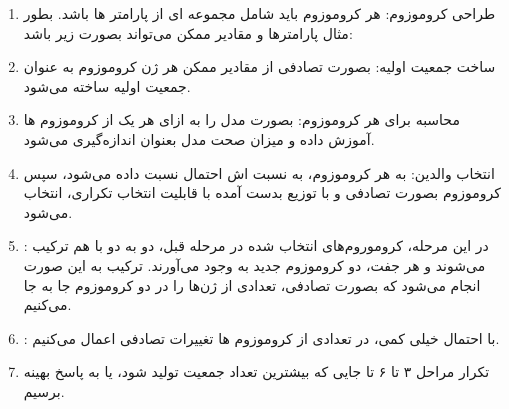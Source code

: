 \documentclass[12pt,onecolumn,a4paper]{article}
\begin{document}
\begin{enumerate}

    \item طراحی کروموزوم: هر کروموزوم باید شامل مجموعه ای از پارامتر ها باشد. بطور مثال پارامتر‌ها و مقادیر ممکن می‌تواند بصورت زیر باشد:

    \item ساخت جمعیت اولیه: بصورت تصادفی از مقادیر ممکن هر ژن  کروموزوم به عنوان جمعیت اولیه ساخته می‌شود.
    \item محاسبه  برای هر کروموزوم: بصورت  مدل را به ازای هر یک از کروموزوم ها آموزش داده و میزان صحت مدل بعنوان  اندازه‌گیری می‌شود.
    \item انتخاب والدین: به هر کروموزوم، به نسبت  اش احتمال نسبت داده می‌شود، سپس  کروموزوم بصورت تصادفی و با توزیع بدست آمده با قابلیت انتخاب تکراری، انتخاب می‌شود.
    \item {}: در این مرحله، کروموروم‌های انتخاب شده در مرحله قبل، دو به دو با هم ترکیب می‌شوند و هر جفت، دو کروموزوم جدید به وجود می‌آورند. ترکیب به این صورت انجام می‌شود که بصورت تصادفی، تعدادی از ژن‌ها را در دو کروموزوم جا به جا می‌کنیم.
    \item {}: با احتمال خیلی کمی، در تعدادی از کروموزوم ها تغییرات تصادفی اعمال می‌کنیم.
    \item تکرار مراحل ۳ تا ۶ تا جایی که بیشترین تعداد جمعیت تولید شود، یا به پاسخ بهینه برسیم.
\end{enumerate}
\end{document}
